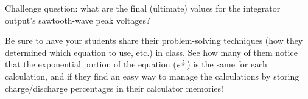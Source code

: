 \vskip 10pt

Challenge question: what are the final (ultimate) values for the integrator output's sawtooth-wave peak voltages?







Be sure to have your students share their problem-solving techniques (how they determined which equation to use, etc.) in class.  See how many of them notice that the exponential portion of the equation ($e^{t \over \tau}$) is the same for each calculation, and if they find an easy way to manage the calculations by storing charge/discharge percentages in their calculator memories!




